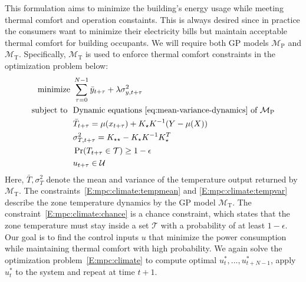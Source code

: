 This formulation aims to minimize the building's energy usage while meeting thermal comfort and operation constaints. 
This is always desired since in practice the consumers want to minimize their electricity bills but maintain acceptable thermal comfort for building occupants.
We will require both GP models \(\mathcal{M}_{\mathrm{P}}\) and \(\mathcal{M}_{\mathrm{T}}\).
Specifically, \(\mathcal{M}_{\mathrm{T}}\) is used to enforce thermal comfort constraints in the optimization problem below:
\begin{subequations}
  \label{E:mpc:climate}
  \begin{align}
    \operatorname*{minimize} \ & \sum_{\tau=0}^{N-1} \bar{y}_{t+\tau} + \lambda \sigma^2_{y,t+\tau} \\
    \text{subject to}\ \  & \text{Dynamic equations \eqref{eq:mean-variance-dynamics} of $\mathcal{M}_{\mathrm{P}}$} \\
                &\bar{T}_{t+\tau} = \mu(x_{t+\tau}) + K_\star K^{-1} (Y - \mu(X)) \label{E:mpc:climate:tempmean} \\
                &\sigma^2_{T,t+\tau} = K_{\star \star} - K_\star K^{-1} K_\star^T \label{E:mpc:climate:tempvar} \\
                &\Pr(T_{t+\tau} \in \mathcal{T}) \geq 1 - \epsilon \label{E:mpc:climate:chance} \\
                &u_{t+\tau} \in \mathcal{U} 
  \end{align}
\end{subequations}
Here, \(\bar{T},\sigma^2_{T}\) denote the mean and variance of the temperature output returned by \(\mathcal{M}_{\mathrm{T}}\). 
The constraints~\eqref{E:mpc:climate:tempmean} and \eqref{E:mpc:climate:tempvar} describe the zone temperature dynamics by the GP model $\mathcal{M}_{\mathrm{T}}$.
The constraint~\eqref{E:mpc:climate:chance} is a chance constraint, which states that the zone temperature must stay inside a set $\mathcal{T}$ with a probability of at least $1 - \epsilon$.
Our goal is to find the control inputs \(u\) that minimize the power consumption while maintaining thermal comfort with high probability. 
We again solve the optimization problem~\eqref{E:mpc:climate} to compute optimal \(u_{t}^*, \dots, u_{t+N-1}^*\), apply \(u_{t}^*\) to the system and repeat at time \(t+1\).



